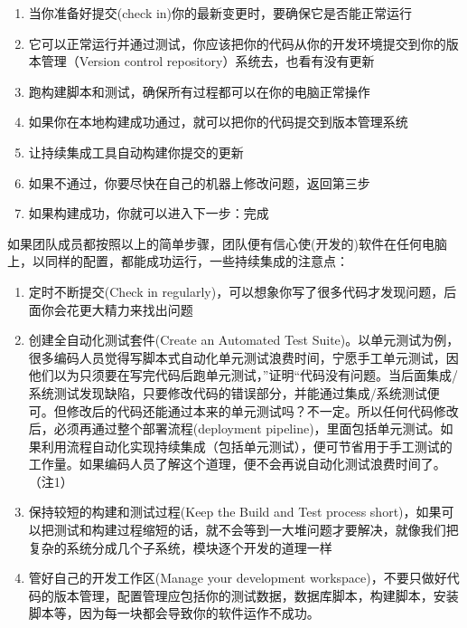 \begin{enumerate}
\tightlist
\item
  当你准备好提交(check in)你的最新变更时，要确保它是否能正常运行
\item
  它可以正常运行并通过测试，你应该把你的代码从你的开发环境提交到你的版本管理（Version
  control repository）系统去，也看有没有更新
\item
  跑构建脚本和测试，确保所有过程都可以在你的电脑正常操作
\item
  如果你在本地构建成功通过，就可以把你的代码提交到版本管理系统
\item
  让持续集成工具自动构建你提交的更新
\item
  如果不通过，你要尽快在自己的机器上修改问题，返回第三步
\item
  如果构建成功，你就可以进入下一步：完成
\end{enumerate}

如果团队成员都按照以上的简单步骤，团队便有信心使(开发的)软件在任何电脑上，以同样的配置，都能成功运行，一些持续集成的注意点：

\begin{enumerate}
\tightlist
\item
  定时不断提交(Check in
  regularly)，可以想象你写了很多代码才发现问题，后面你会花更大精力来找出问题
\item
  创建全自动化测试套件(Create an Automated Test
  Suite)。以单元测试为例，很多编码人员觉得写脚本式自动化单元测试浪费时间，宁愿手工单元测试，因他们以为只须要在写完代码后跑单元测试，''证明``代码没有问题。当后面集成/系统测试发现缺陷，只要修改代码的错误部分，并能通过集成/系统测试便可。但修改后的代码还能通过本来的单元测试吗？不一定。所以任何代码修改后，必须再通过整个部署流程(deployment
  pipeline)，里面包括单元测试。如果利用流程自动化实现持续集成（包括单元测试），便可节省用于手工测试的工作量。如果编码人员了解这个道理，便不会再说自动化测试浪费时间了。（注1）
\item
  保持较短的构建和测试过程(Keep the Build and Test process
  short)，如果可以把测试和构建过程缩短的话，就不会等到一大堆问题才要解决，就像我们把复杂的系统分成几个子系统，模块逐个开发的道理一样
\item
  管好自己的开发工作区(Manage your development
  workspace)，不要只做好代码的版本管理，配置管理应包括你的测试数据，数据库脚本，构建脚本，安装脚本等，因为每一块都会导致你的软件运作不成功。
\end{enumerate}

\begin{description}
\item[]
\end{description}

